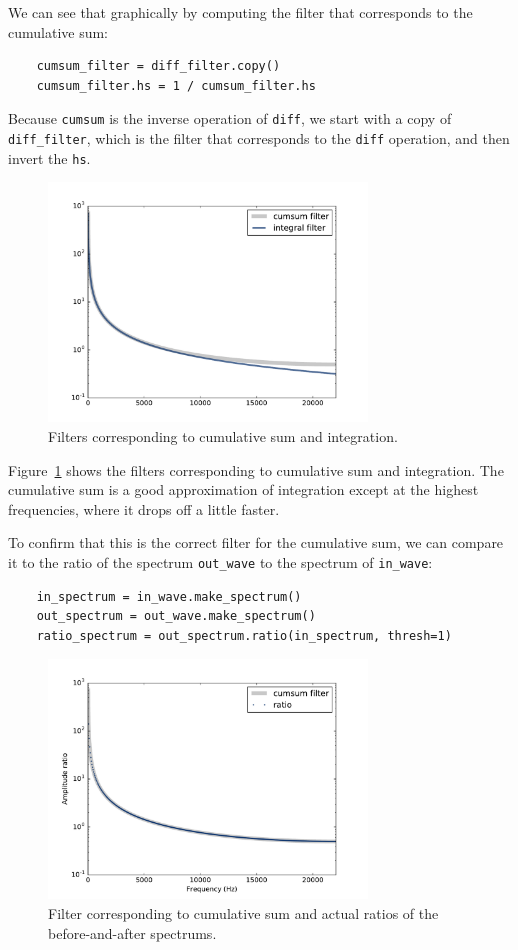 \documentclass[12pt]{book}
\begin{document}
We can see that graphically by computing the filter that corresponds
to the cumulative sum:

\begin{verbatim}
    cumsum_filter = diff_filter.copy()
    cumsum_filter.hs = 1 / cumsum_filter.hs
\end{verbatim}

Because {\tt cumsum} is the inverse operation of {\tt diff}, we
start with a copy of \verb"diff_filter", which is the filter
that corresponds to the {\tt diff} operation, and then invert the
{\tt hs}.

\begin{figure}
\centerline{\includegraphics[height=2.5in]{figs/diff_int8.pdf}}
\caption{Filters corresponding to cumulative sum and integration.}
\label{fig.diff_int8}
\end{figure}

Figure~\ref{fig.diff_int8} shows the filters corresponding to
cumulative sum and integration.  The cumulative sum is a good
approximation of integration except at the highest frequencies,
where it drops off a little faster. 

To confirm that this is the correct filter for the cumulative
sum, we can compare it to the ratio of the spectrum
\verb"out_wave" to the spectrum of \verb"in_wave":

\begin{verbatim}
    in_spectrum = in_wave.make_spectrum()
    out_spectrum = out_wave.make_spectrum()
    ratio_spectrum = out_spectrum.ratio(in_spectrum, thresh=1)
\end{verbatim}

\begin{figure}
\centerline{\includegraphics[height=2.5in]{figs/diff_int9.pdf}}
\caption{Filter corresponding to cumulative sum and actual ratios of
  the before-and-after spectrums.}
\label{fig.diff_int9}
\end{figure}
\end{document}
